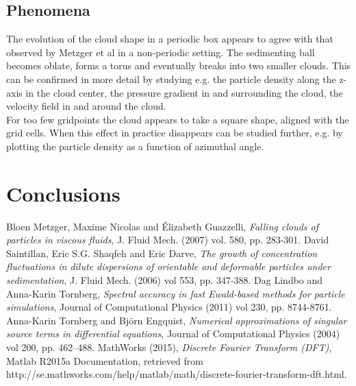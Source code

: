 \documentclass[a4paper,twoside=false,abstract=false,numbers=noenddot,
titlepage=false,headings=small,parskip=half,version=last]{scrartcl}
\begin{document}
\subsection{Phenomena}
The evolution of the cloud shape in a periodic box appears to agree with that observed by Metzger et al \cite{fallingclouds} in a non-periodic setting. The sedimenting ball becomes oblate, forms a torus and eventually breaks into two smaller clouds. This can be confirmed in more detail by studying e.g. the particle density along the z-axis in the cloud center, the pressure gradient in and surrounding the cloud, the velocity field in and around the cloud.\\
For too few gridpoints the cloud appears to take a square shape, aligned with the grid cells. When this effect in practice disappears can be studied further, e.g. by plotting the particle density as a function of azimuthal angle.\\

\section{Conclusions}

\begin{thebibliography}{1}
		Bloen Metzger, Maxime Nicolas and Élizabeth Guazzelli,
		{\em Falling clouds of particles in viscous fluids},
		J. Fluid Mech. (2007) vol. 580, pp. 283-301.
        David Saintillan, Eric S.G. Shaqfeh and Eric Darve,
        {\em The growth of concentration fluctuations in dilute dispersions of orientable and deformable particles under sedimentation},
        J. Fluid Mech. (2006) vol 553, pp. 347-388.
        Dag Lindbo and Anna-Karin Tornberg,
        {\em Spectral accuracy in fast Ewald-based methods for particle simulations},
        Journal of Computational Physics (2011) vol 230, pp. 8744-8761.
        Anna-Karin Tornberg and Björn Engquist,
        {\em Numerical approximations of singular source terms
in differential equations},
        Journal of Computational Physics (2004) vol 200, pp. 462–488.
        MathWorks (2015),
        {\em Discrete Fourier Transform (DFT)},
        Matlab R2015a Documentation, retrieved from http://se.mathworks.com/help/matlab/math/discrete-fourier-transform-dft.html.
	
\end{thebibliography}
\end{document}
